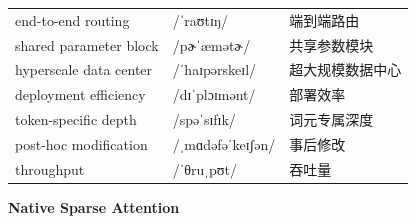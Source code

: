 \documentclass[UTF8,12pt,a4paper]{ctexart}
\providecommand{\zh}[1]{#1}
\begin{document}
\begin{tabular*}{\textwidth}{@{\extracolsep{\fill}}lll@{}}
end-to-end routing & {\ipafont /ˈraʊtɪŋ/} & \zh{端到端路由} \\
shared parameter block & {\ipafont /pɚˈæmətɚ/} & \zh{共享参数模块} \\
hyperscale data center & {\ipafont /ˈhaɪpərskeɪl/} & \zh{超大规模数据中心} \\
deployment efficiency & {\ipafont /dɪˈplɔɪmənt/} & \zh{部署效率} \\
token-specific depth & {\ipafont /spəˈsɪfɪk/} & \zh{词元专属深度} \\
post-hoc modification & {\ipafont /ˌmɑdəfəˈkeɪʃən/} & \zh{事后修改} \\
throughput & {\ipafont /ˈθruˌpʊt/} & \zh{吞吐量} \\
\bottomrule
\end{tabular*}

\newpage

\begin{center}
    {\Large\bfseries Native Sparse Attention}
\end{center}
\end{document}
